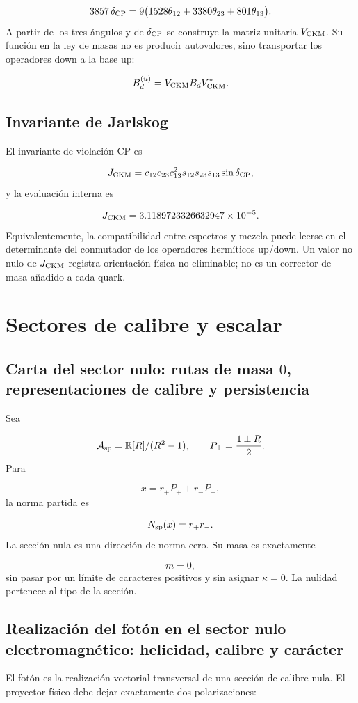 \[
 3857\,\delta_{\rm CP}
 =9\bigl(
 1528\theta_{12}
 +3380\theta_{23}
 +801\theta_{13}
 \bigr).
\]
A partir de los tres ángulos y de \(\delta_{\rm CP}\) se construye la matriz unitaria \(V_{\rm CKM}\). Su función en la ley de masas no es producir autovalores, sino transportar los operadores down a la base up:

\[
 B_d^{(u)}=V_{\rm CKM}B_dV_{\rm CKM}^*.
\]
\subsection{Invariante de Jarlskog}
El invariante de violación CP es

\[
 J_{\rm CKM}
 =c_{12}c_{23}c_{13}^2
 s_{12}s_{23}s_{13}\sin\delta_{\rm CP},
\]
y la evaluación interna es

\[
 J_{\rm CKM}
 =3.1189723326632947\times10^{-5}.
\]
Equivalentemente, la compatibilidad entre espectros y mezcla puede leerse en el determinante del conmutador de los operadores hermíticos up/down. Un valor no nulo de \(J_{\rm CKM}\) registra orientación física no eliminable; no es un corrector de masa añadido a cada quark.

\section{Sectores de calibre y escalar}
\subsection{Carta del sector nulo: rutas de masa \(0\), representaciones de calibre y persistencia}
Sea

\[
 \mathcal A_{\rm sp}=\mathbb R[R]/(R^2-1),
 \qquad
 P_\pm=\frac{1\pm R}{2}.
\]
Para

\[
 x=r_+P_++r_-P_-,
\]
la norma partida es

\[
 N_{\rm sp}(x)=r_+r_-.
\]
La sección nula es una dirección de norma cero. Su masa es exactamente

\[
 m=0,
\]
sin pasar por un límite de caracteres positivos y sin asignar \(\kappa=0\). La nulidad pertenece al tipo de la sección.

\subsection{Realización del fotón en el sector nulo electromagnético: helicidad, calibre y carácter}
El fotón es la realización vectorial transversal de una sección de calibre nula. El proyector físico debe dejar exactamente dos polarizaciones:

